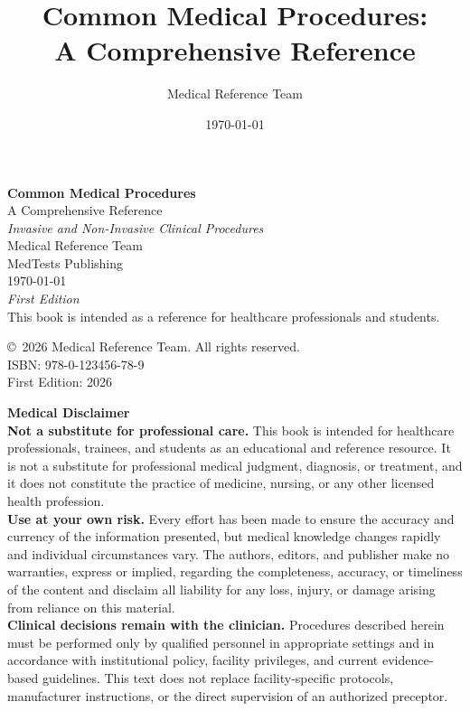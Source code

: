\documentclass[12pt,oneside]{book}
\title{Common Medical Procedures:\\ A Comprehensive Reference}
\author{Medical Reference Team}
\date{\today}
\begin{document}
\frontmatter

\begin{titlepage}
    \centering
    \vspace*{2cm}
    {\Huge \bfseries Common Medical Procedures}\\[0.5cm]
    {\Large A Comprehensive Reference}\\[1.5cm]
    {\large \textit{Invasive and Non-Invasive Clinical Procedures}}\\[2cm]
    {\large Medical Reference Team}\\[0.5cm]
    {\normalsize MedTests Publishing}\\[1cm]
    {\today}\\[2cm]
    {\small \textit{First Edition}}\\
    \vfill
    {\footnotesize This book is intended as a reference for healthcare professionals and students.}
\end{titlepage}

\newpage
\thispagestyle{empty}
\vspace*{\fill}
\noindent \copyright\ 2026 Medical Reference Team. All rights reserved.\\[0.5cm]
ISBN: 978-0-123456-78-9\\[0.5cm]
First Edition: 2026

\vspace{1cm}
\noindent\textbf{Medical Disclaimer}\\[0.5cm]

\noindent\textbf{Not a substitute for professional care.} This book is intended for healthcare professionals, trainees, and students as an educational and reference resource. It is not a substitute for professional medical judgment, diagnosis, or treatment, and it does not constitute the practice of medicine, nursing, or any other licensed health profession.\\[0.3cm]

\noindent\textbf{Use at your own risk.} Every effort has been made to ensure the accuracy and currency of the information presented, but medical knowledge changes rapidly and individual circumstances vary. The authors, editors, and publisher make no warranties, express or implied, regarding the completeness, accuracy, or timeliness of the content and disclaim all liability for any loss, injury, or damage arising from reliance on this material.\\[0.3cm]

\noindent\textbf{Clinical decisions remain with the clinician.} Procedures described herein must be performed only by qualified personnel in appropriate settings and in accordance with institutional policy, facility privileges, and current evidence-based guidelines. This text does not replace facility-specific protocols, manufacturer instructions, or the direct supervision of an authorized preceptor.\\[0.3cm]
\end{document}
